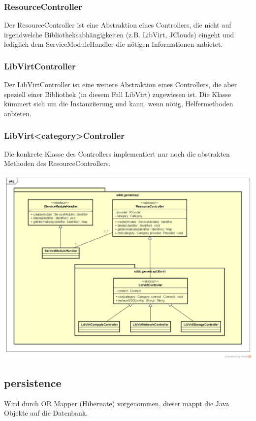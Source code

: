 \subsubsection{ResourceController}
Der ResourceController ist eine Abstraktion eines Controllers, die nicht auf irgendwelche Bibliotheksabhängigkeiten (z.B. LibVirt, JClouds) eingeht und lediglich dem ServiceModuleHandler die nötigen Informationen anbietet.

\subsubsection{LibVirtController}
Der LibVirtController ist eine weitere Abstraktion eines Controllers, die aber speziell einer Bibliothek (in diesem Fall LibVirt) zugewiesen ist. Die Klasse kümmert sich um die Instanziierung und kann, wenn nötig, Helfermethoden anbieten.

\subsubsection{LibVirt<category>Controller}

Die konkrete Klasse des Controllers implementiert nur noch die abstrakten Methoden des ResourceControllers.

\includegraphics[width=\textwidth]{./05_Design/04_Architektur/genericapi}

\subsection{persistence}

Wird durch OR Mapper (Hibernate) vorgenommen, dieser mappt die Java Objekte auf 
die Datenbank.

